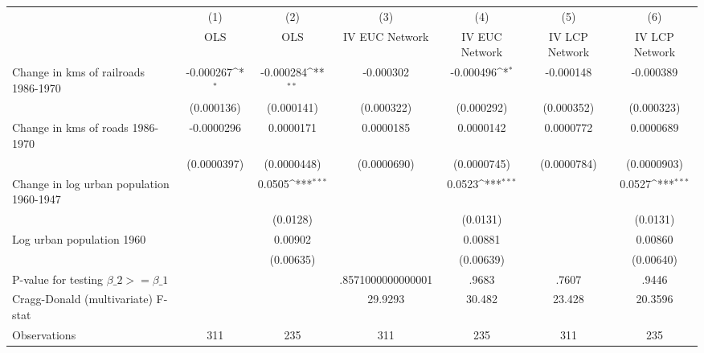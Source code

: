 {
\def\sym#1{\ifmmode^{#1}\else\(^{#1}\)\fi}
\begin{tabular}{l*{6}{c}}
\hline\hline
                &\multicolumn{1}{c}{(1)}&\multicolumn{1}{c}{(2)}&\multicolumn{1}{c}{(3)}&\multicolumn{1}{c}{(4)}&\multicolumn{1}{c}{(5)}&\multicolumn{1}{c}{(6)}\\
                &\multicolumn{1}{c}{OLS}&\multicolumn{1}{c}{OLS}&\multicolumn{1}{c}{IV EUC Network}&\multicolumn{1}{c}{IV EUC Network}&\multicolumn{1}{c}{IV LCP Network}&\multicolumn{1}{c}{IV LCP Network}\\
\hline
Change in kms of railroads 1986-1970&-0.000267\sym{*}  &-0.000284\sym{**} &-0.000302         &-0.000496\sym{*}  &-0.000148         &-0.000389         \\
                &(0.000136)         &(0.000141)         &(0.000322)         &(0.000292)         &(0.000352)         &(0.000323)         \\
[1em]
Change in kms of roads 1986-1970&-0.0000296         &0.0000171         &0.0000185         &0.0000142         &0.0000772         &0.0000689         \\
                &(0.0000397)         &(0.0000448)         &(0.0000690)         &(0.0000745)         &(0.0000784)         &(0.0000903)         \\
[1em]
Change in log urban population 1960-1947&                  &   0.0505\sym{***}&                  &   0.0523\sym{***}&                  &   0.0527\sym{***}\\
                &                  & (0.0128)         &                  & (0.0131)         &                  & (0.0131)         \\
[1em]
Log urban population 1960&                  &  0.00902         &                  &  0.00881         &                  &  0.00860         \\
                &                  &(0.00635)         &                  &(0.00639)         &                  &(0.00640)         \\
\hline
P-value for testing $\beta\_{2} >= \beta\_{1}$&                  &                  &.8571000000000001         &    .9683         &    .7607         &    .9446         \\
Cragg-Donald (multivariate) F-stat&                  &                  &  29.9293         &   30.482         &   23.428         &  20.3596         \\
Observations    &      311         &      235         &      311         &      235         &      311         &      235         \\
\hline\hline
\end{tabular}
}
